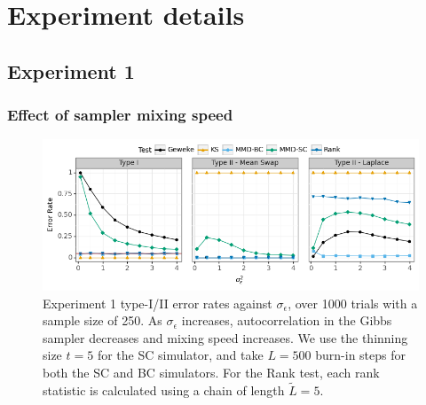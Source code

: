 \section{Experiment details}
\subsection{Experiment 1}
\subsubsection{Effect of sampler mixing speed}
\label{appendix:ex1a}
\begin{figure}[H]
    \centering
    \includegraphics[width=\textwidth]{figures/results_1a.png}
    \caption{Experiment 1 type-I/II error rates against $\sigma_{\epsilon}$, over 1000 trials with a sample size of 250. As $\sigma_{\epsilon}$ increases, autocorrelation in the Gibbs sampler decreases and mixing speed increases. We use the thinning size $t=5$ for the SC simulator, and take $L=500$ burn-in steps for both the SC and BC simulators. For the Rank test, each rank statistic is calculated using a chain of length $\tilde{L}=5$.}
    \label{fig:ex1a}
\end{figure}

